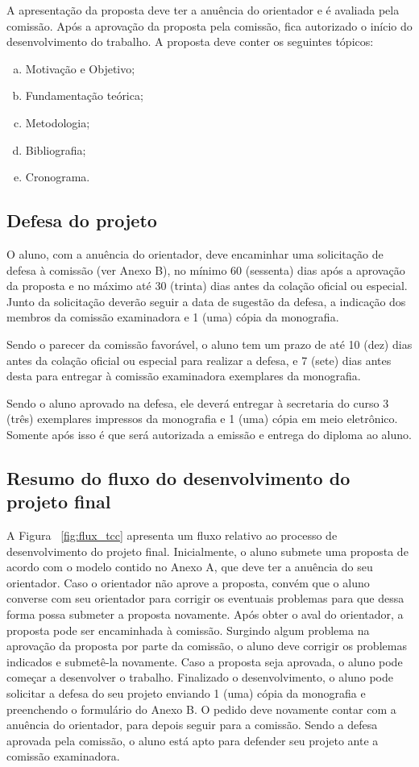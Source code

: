 A apresentação da proposta deve ter a anuência do orientador e é avaliada pela comissão. Após a 
aprovação da proposta pela comissão, fica autorizado o início do desenvolvimento do trabalho.
A proposta deve conter os seguintes tópicos:

\begin{enumerate}[a.]
\item Motivação e Objetivo;
\item Fundamentação teórica;
\item Metodologia;
\item Bibliografia;
\item Cronograma.
\end{enumerate}

\subsection{Defesa do projeto}
\label{sec:defesa}
O aluno, com a anuência do orientador, deve encaminhar uma solicitação de defesa
à comissão (ver Anexo B), no mínimo 60 (sessenta) dias após a aprovação da proposta e no máximo 
até 30 (trinta) dias antes da colação oficial ou especial.
Junto da solicitação deverão seguir a data de sugestão da defesa, a indicação
dos membros da comissão examinadora e 1 (uma) cópia da monografia.

Sendo o parecer da comissão favorável, o aluno tem um prazo de até 10 (dez)
dias antes da colação oficial ou especial para realizar a defesa, e 7 (sete) dias
antes desta para entregar à comissão examinadora exemplares da monografia.

Sendo o aluno aprovado na defesa, ele deverá entregar à secretaria do curso 3 (três)
exemplares impressos da monografia e 1 (uma) cópia em meio eletrônico. Somente após 
isso é que será autorizada a emissão e entrega do diploma ao aluno.

\subsection{Resumo do fluxo do desenvolvimento do projeto final}
A Figura ~\ref{fig:flux_tcc} apresenta um fluxo relativo ao processo de desenvolvimento do projeto final. 
Inicialmente, o aluno submete uma proposta de acordo com o modelo contido no Anexo A, 
que deve ter a anuência do seu orientador. Caso o orientador não aprove a proposta, convém que
o aluno converse com seu orientador para corrigir os eventuais problemas para que dessa forma possa
submeter a proposta novamente. Após obter o aval do orientador, a proposta pode ser encaminhada
à comissão. Surgindo algum problema na aprovação da proposta por parte da comissão, o aluno
deve corrigir os problemas indicados e submetê-la novamente. Caso a proposta seja aprovada, o aluno
pode começar a desenvolver o trabalho. Finalizado o desenvolvimento, o aluno pode solicitar 
a defesa do seu projeto enviando 1 (uma) cópia da monografia e preenchendo o formulário do
Anexo B. O pedido deve novamente contar com a anuência do orientador, para depois
seguir para a comissão. Sendo a defesa aprovada pela comissão, o aluno está apto para defender
seu projeto ante a comissão examinadora.


